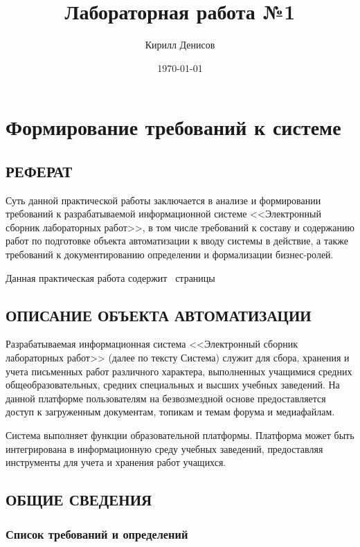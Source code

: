 \documentclass[a4paper,14pt]{extarticle}
\author{Кирилл Денисов}
\title{Лабораторная работа №1}
\date{\today}
\newcommand{\pathToCommonFolder}{/home/denilai/Documents/repos/latex/Common}
\begin{document}
	\thispagestyle{empty}
	
	\newpage
	\tableofcontents
	\newpage
	
\normalsize

\section{Формирование требований к системе}
\subsection{РЕФЕРАТ}
Суть данной практической работы заключается в анализе и формировании требований к разрабатываемой информационной системе <<Электронный сборник лабораторных работ>>, в том числе требований к составу и содержанию работ по подготовке объекта автоматизации к вводу системы в действие, а также требований к документированию определении и формализации бизнес-ролей.

Данная практическая работа содержит
\pageref*{LastPage}~страницы

\subsection{ОПИСАНИЕ ОБЪЕКТА АВТОМАТИЗАЦИИ}

Разрабатываемая информационная система <<Электронный сборник лабораторных работ>> (далее по тексту Система) служит для сбора, хранения и учета письменных работ различного характера, выполненных учащимися средних общеобразовательных, средних специальных и высших учебных заведений. На данной платформе пользователям на безвозмездной основе предоставляется доступ к загруженным документам, топикам и темам форума и медиафайлам. 

Система выполняет функции образовательной платформы. Платформа может быть интегрирована в информационную среду учебных заведений, предоставляя инструменты для учета и хранения работ учащихся. 

\subsection{ОБЩИЕ СВЕДЕНИЯ}
\subsubsection{Список требований и определений}
\end{document}
